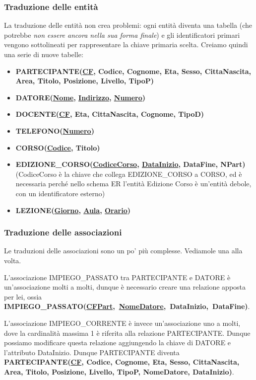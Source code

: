 \documentclass[11pt, a4paper, titlepage, oneside]{scrbook}
\begin{document}
\subsubsection*{Traduzione delle entità}

La traduzione delle entità non crea problemi: ogni entità diventa una tabella (che potrebbe \textit{non essere ancora nella sua forma finale}) e gli identificatori primari vengono sottolineati per rappresentare la chiave primaria scelta. Creiamo quindi una serie di nuove tabelle:
\begin{itemize}
    \item \textbf{PARTECIPANTE(\underline{CF}, Codice, Cognome, Eta, Sesso, CittaNascita, Area, Titolo, Posizione, Livello, TipoP)}
    \item \textbf{DATORE(\underline{Nome}, \underline{Indirizzo}, \underline{Numero})}
    \item \textbf{DOCENTE(\underline{CF}, Eta, CittaNascita, Cognome, TipoD)}
    \item \textbf{TELEFONO(\underline{Numero})}
    \item \textbf{CORSO(\underline{Codice}, Titolo)}
    \item \textbf{EDIZIONE\_CORSO(\underline{CodiceCorso}, \underline{DataInizio}, DataFine, NPart)} (CodiceCorso è la chiave che collega EDIZIONE\_CORSO a CORSO, ed è necessaria perché nello schema ER l'entità Edizione Corso è un'entità debole, con un identificatore esterno) 
    \item \textbf{LEZIONE(\underline{Giorno}, \underline{Aula}, \underline{Orario})}
\end{itemize}

\subsubsection*{Traduzione delle associazioni}

Le traduzioni delle associazioni sono un po' più complesse. Vediamole una alla volta.

L'associazione IMPIEGO\_PASSATO tra PARTECIPANTE e DATORE è un'associazione molti a molti, dunque è necessario creare una relazione apposta per lei, ossia \mbox{\textbf{IMPIEGO\_PASSATO(\underline{CFPart}, \underline{NomeDatore}, DataInizio, DataFine)}}.

L'associazione IMPIEGO\_CORRENTE è invece un'associazione uno a molti, dove la cardinalità massima 1 è riferita alla relazione PARTECIPANTE. Dunque possiamo modificare questa relazione aggiungendo la chiave di DATORE e l'attributo DataInizio. Dunque PARTECIPANTE diventa \textbf{PARTECIPANTE(\underline{CF}, Codice, Cognome, Eta, Sesso, CittaNascita, Area, Titolo, Posizione, Livello, TipoP, NomeDatore, DataInizio)}.
\end{document}
